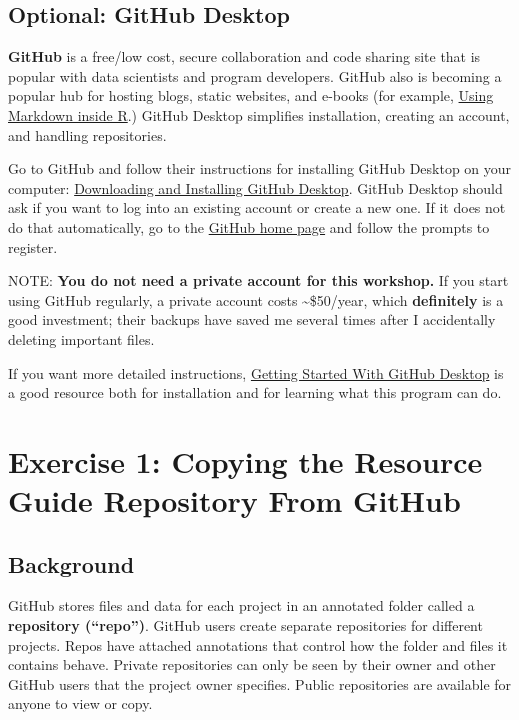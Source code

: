 \documentclass[
]{article}
\begin{document}
\hypertarget{optional-github-desktop}{%
\subsection{Optional: GitHub Desktop}\label{optional-github-desktop}}

\textbf{GitHub} is a free/low cost, secure collaboration and code
sharing site that is popular with data scientists and program
developers. GitHub also is becoming a popular hub for hosting blogs,
static websites, and e-books (for example,
\href{https://bookdown.org/yihui/rmarkdown/}{Using Markdown inside R}.)
GitHub Desktop simplifies installation, creating an account, and
handling repositories.

Go to GitHub and follow their instructions for installing GitHub Desktop
on your computer: \href{https://desktop.github.com/}{Downloading and
Installing GitHub Desktop}. GitHub Desktop should ask if you want to log
into an existing account or create a new one. If it does not do that
automatically, go to the \href{https://github.com/}{GitHub home page}
and follow the prompts to register.

NOTE: \textbf{You do not need a private account for this workshop.} If
you start using GitHub regularly, a private account costs
\textasciitilde\$50/year, which \textbf{definitely} is a good
investment; their backups have saved me several times after I
accidentally deleting important files.

If you want more detailed instructions,
\href{https://docs.github.com/en/desktop/installing-and-configuring-github-desktop/overview/getting-started-with-github-desktop}{Getting
Started With GitHub Desktop} is a good resource both for installation
and for learning what this program can do.

\hypertarget{exercise-1-copying-the-resource-guide-repository-from-github}{%
\section{Exercise 1: Copying the Resource Guide Repository From
GitHub}\label{exercise-1-copying-the-resource-guide-repository-from-github}}

\hypertarget{background}{%
\subsection{Background}\label{background}}

GitHub stores files and data for each project in an annotated folder
called a \textbf{repository (``repo'')}. GitHub users create separate
repositories for different projects. Repos have attached annotations
that control how the folder and files it contains behave. Private
repositories can only be seen by their owner and other GitHub users that
the project owner specifies. Public repositories are available for
anyone to view or copy.
\end{document}
